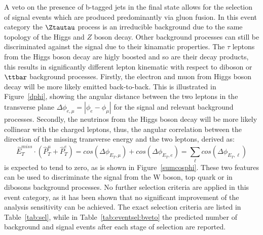 A veto on the presence of b-tagged jets in the final state allows for the selection of signal events which
are produced predominantly via gluon fusion. In this event category the 
$\Ztautau$  process is an irreducible background due to the same topology of the Higgs and $Z$ boson decay.
Other background processes can still be discriminated against the signal due to their kinamatic properties.
The $\tau$ leptons from the Higgs boson decay are higly boosted and so are their decay products, this results
in significantly different lepton kinematic with respect to diboson or $\ttbar$ background processes. 
Firstly, the electron and muon from Higgs boson decay 
will be more likely emitted back-to-back. This is illustrated in Figure~\ref{dphi}, showing 
the angular distance between the two leptons in the transverse plane 
$\Delta\phi_{e,\mu} = |\phi_{e} - \phi_{\mu}|$ for the signal and relevant background processes.  
Secondly, the neutrinos from the Higgs boson decay  will be more likely collinear with the charged leptons,
thus, the angular correlation between the direction of the missing transverse energy and the two leptons,
derived as: 
$$ \hat{E}_{T}^{miss} \cdot ( \hat{P}_{T}^{\mu} + \hat{P}_{T}^{e} ) = cos(\Delta\phi_{E_{T},\mu}) 
+ cos(\Delta\phi_{E_{T},e}) = \sum_\ell cos(\Delta\phi_{E_{T},\ell}) $$
is expected to tend to zero, as is shown in Figure~\ref{sumcosphi}. 
These two features can be used to discriminate the signal from the W boson, top quark or in dibosons background processes.
No further selection criteria are applied in this event category, as it has been shown that no significant improvement
of the analysis sensitivity can be achieved.
The exact selection criteria are listed in Table~\ref{tab:sel}, while in Table~\ref{tab:eventsel:bveto}
the predicted number of background and signal events after each stage of selection are reported.


